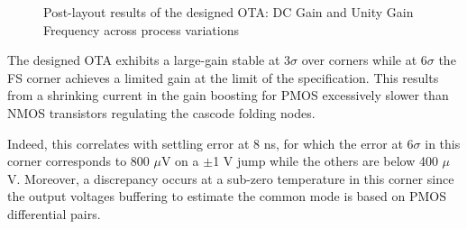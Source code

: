 \begin{figure}[htp]
    \centering
    \begin{subfigure}[b]{0.48\textwidth}
        \resizebox{\textwidth}{!}{
            
        }
        \label{fig:ota_dc_gain_temp_corners}
    \end{subfigure}
    \begin{subfigure}[b]{0.48\textwidth}
        \resizebox{\textwidth}{!}{
            
        }
        \label{fig:ota_dc_gain_temp_corners}
    \end{subfigure}
    \begin{subfigure}[b]{0.48\textwidth}
        \resizebox{\textwidth}{!}{
            
        }
        \label{fig:ota_ugf_temp_corners}
    \end{subfigure}
    \begin{subfigure}[b]{0.48\textwidth}
        \resizebox{\textwidth}{!}{
            
        }
        \label{fig:ota_ugf_1pF_temp_corners}
    \end{subfigure}
    \caption{Post-layout results of the designed OTA: DC Gain and Unity Gain Frequency across process variations}
    \label{fig:ota_result}
\end{figure}

The designed OTA exhibits a large-gain stable at \(3\sigma \) over corners while at \(6\sigma \) the FS corner achieves a limited gain at the limit of the specification. This results from a shrinking current in the gain boosting for PMOS excessively slower than NMOS transistors regulating the cascode folding nodes.

Indeed, this correlates with settling error at 8 ns, for which the error at \(6\sigma \) in this corner corresponds to 800 \(\mu \)V on a \(\pm \)1 V jump while the others are below 400 \(\mu \)V. Moreover, a discrepancy occurs at a sub-zero temperature in this corner since the output voltages buffering to estimate the common mode is based on PMOS differential pairs.

